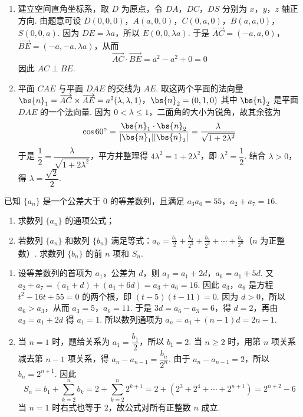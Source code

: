 \begin{solution}
\begin{enumerate}
\item 建立空间直角坐标系，取 \(D\) 为原点，令 \(DA\)，\(DC\)，\(DS\) 分别为 \(x\)，\(y\)，\(z\) 轴正方向. 由题意可设 \(D(0,0,0)\)，\(A(a,0,0)\)，\(C(0,a,0)\)，\(B(a,a,0)\)，\(S(0,0,a)\). 因为 \(DE=\lambda a\)，所以 \(E(0,0,\lambda a)\). 于是 \(\overrightarrow{AC}=(-a,a,0)\)，\(\overrightarrow{BE}=(-a,-a,\lambda a)\)，从而
\[
\overrightarrow{AC}\cdot\overrightarrow{BE}=a^2-a^2+0=0
\]
因此 \(AC\perp BE\).
\item 平面 \(CAE\) 与平面 \(DAE\) 的交线为 \(AE\). 取这两个平面的法向量
\(\bs{n}_1=\overrightarrow{AC}\times\overrightarrow{AE}=a^2(\lambda,\lambda,1)\)，\(\bs{n}_2=(0,1,0)\)
其中 \(\bs{n}_2\) 是平面 \(DAE\) 的一个法向量. 因为 \(0<\lambda\leq1\)，二面角的大小为锐角，故其余弦为
\[
\cos60^\circ=\frac{\bs{n}_1\cdot\bs{n}_2}{|\bs{n}_1||\bs{n}_2|}=\frac{\lambda}{\sqrt{1+2\lambda^2}}
\]
于是 \(\dfrac12=\dfrac{\lambda}{\sqrt{1+2\lambda^2}}\)，平方并整理得 \(4\lambda^2=1+2\lambda^2\)，即 \(\lambda^2=\dfrac12\). 结合 \(\lambda>0\)，得 \(\lambda=\dfrac{\sqrt2}{2}\).
\end{enumerate}
\end{solution}

\begin{problem}
已知 \(\{a_{n}\}\) 是一个公差大于 \(0\) 的等差数列，且满足 \(a_{3}a_{6} = 55\)，\(a_{2} + a_{7} = 16\).

\begin{enumerate}
\item 求数列 \(\{a_{n}\}\) 的通项公式；
\item 若数列 \(\{a_{n}\}\) 和数列 \(\{b_{n}\}\) 满足等式：\(a_{n} = \frac{b_{1}}{2} + \frac{b_{2}}{2^{2}} + \frac{b_{3}}{2^{3}} + \cdots + \frac{b_{n}}{2^{n}}\)（\(n\) 为正整数）. 求数列 \(\{b_{n}\}\) 的前 \(n\) 项和 \(S_{n}\).
\end{enumerate}
\end{problem}

\begin{solution}
\begin{enumerate}
\item 设等差数列的首项为 \(a_1\)，公差为 \(d\)，则 \(a_3=a_1+2d\)，\(a_6=a_1+5d\). 又 \(a_2+a_7=(a_1+d)+(a_1+6d)=a_3+a_6=16\). 因此 \(a_3\)，\(a_6\) 是方程 \(t^2-16t+55=0\) 的两个根，即 \((t-5)(t-11)=0\). 因为 \(d>0\)，所以 \(a_6>a_3\)，从而 \(a_3=5\)，\(a_6=11\). 于是 \(3d=a_6-a_3=6\)，得 \(d=2\)，再由 \(a_3=a_1+2d\) 得 \(a_1=1\). 所以数列通项为 \(a_n=a_1+(n-1)d=2n-1\).
\item 当 \(n=1\) 时，题给关系为 \(a_1=\dfrac{b_1}{2}\)，所以 \(b_1=2\). 当 \(n\geq2\) 时，用第 \(n\) 项关系减去第 \(n-1\) 项关系，得 \(a_n-a_{n-1}=\dfrac{b_n}{2^n}\). 由于 \(a_n-a_{n-1}=2\)，所以 \(b_n=2^{n+1}\). 因此
\[
S_n=b_1+\sum_{k=2}^n b_k=2+\sum_{k=2}^n2^{k+1}=2+\left(2^3+2^4+\cdots+2^{n+1}\right)=2^{n+2}-6
\]
当 \(n=1\) 时右式也等于 \(2\)，故公式对所有正整数 \(n\) 成立.
\end{enumerate}
\end{solution}

